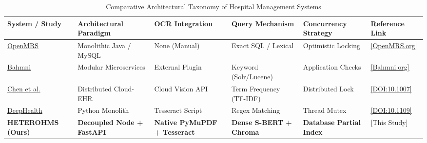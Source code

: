 \documentclass[conference]{IEEEtran}
\begin{document}
\begin{table}[t]
\centering
\caption{Comparative Architectural Taxonomy of Hospital Management Systems}
\label{tab:hms_comparison}
\begin{tabularx}{\textwidth}{@{}l p{3.2cm} p{2.6cm} p{3.0cm} p{2.6cm} l@{}}
\toprule
\textbf{System / Study} & \textbf{Architectural Paradigm} & \textbf{OCR Integration} & \textbf{Query Mechanism} & \textbf{Concurrency Strategy} & \textbf{Reference Link} \\ \midrule
\href{https://openmrs.org}{OpenMRS} \cite{biondich2006openmrs} & Monolithic Java / MySQL & None (Manual) & Exact SQL / Lexical & Optimistic Locking & \href{https://openmrs.org}{[OpenMRS.org]} \\
\href{https://www.bahmni.org}{Bahmni} \cite{thoughtworks2021bahmni} & Modular Microservices & External Plugin & Keyword (Solr/Lucene) & Application Checks & \href{https://www.bahmni.org}{[Bahmni.org]} \\
\href{https://doi.org/10.1007/s10916-018-1153-7}{Chen et al.} \cite{chen2019blockchain} & Distributed Cloud-EHR & Cloud Vision API & Term Frequency (TF-IDF) & Distributed Lock & \href{https://doi.org/10.1007/s10916-018-1153-7}{[DOI:10.1007]} \\
\href{https://doi.org/10.1109/TII.2018.2872367}{DeepHealth} \cite{czekster2018performance} & Python Monolith & Tesseract Script & Regex Matching & Thread Mutex & \href{https://doi.org/10.1109/TII.2018.2872367}{[DOI:10.1109]} \\
\textbf{HETEROHMS (Ours)} & \textbf{Decoupled Node + FastAPI} & \textbf{Native PyMuPDF + Tesseract} & \textbf{Dense S-BERT + Chroma} & \textbf{Database Partial Index} & [This Study] \\ \bottomrule
\end{tabularx}
\end{table}
\end{document}
